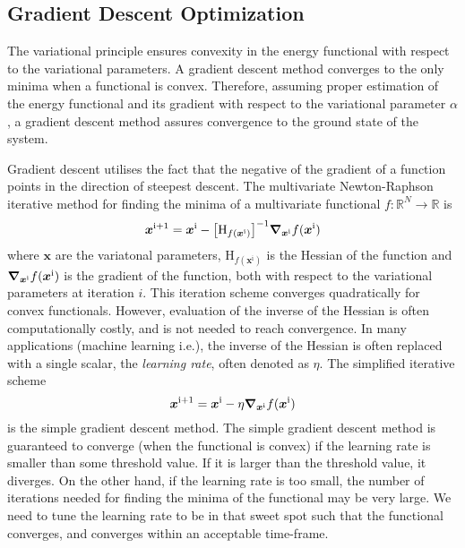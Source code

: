\subsection{Gradient Descent Optimization}\label{sec:gradient_descent}

The variational principle ensures convexity in the energy functional with respect to the variational parameters. A gradient descent method converges to the only minima when a functional is convex. Therefore, assuming proper estimation of the energy functional and its gradient with respect to the variational parameter $\alpha$, a gradient descent method assures convergence to the ground state of the system. 


Gradient descent utilises the fact that the negative of the gradient of a function points in the direction of steepest descent. The multivariate Newton-Raphson iterative method for finding the minima of a multivariate functional $f:\mathbb{R}^N\to\mathbb{R}$ is   
\begin{equation}
    \bm{x}^{\mathrm{i}+1} = \bm{x}^{\mathrm{i}} - \qty[\mathrm{H}_{f(\bm{x}^{\mathrm{i}})}]^{-1}\grad_{\bm{x}^{\mathrm{i}}} f(\bm{x}^{\mathrm{i}})
\end{equation}
where $\bm{x}$ are the variatonal parameters, $\mathrm{H}_{f(\bm{x}^{\mathrm{i}})}$ is the Hessian of the function and $\grad_{\bm{x}^{\mathrm{i}}}f(\bm{x}^{\mathrm{i}})$ is the gradient of the function, both with respect to the variational parameters at iteration $i$. This iteration scheme converges quadratically for convex functionals. However, evaluation of the inverse of the Hessian is often computationally costly, and is not needed to reach convergence. In many applications (machine learning i.e.), the inverse of the Hessian is often replaced with a single scalar, the \textit{learning rate}, often denoted as $\eta$. The simplified iterative scheme 
\begin{equation}
    \bm{x}^{\mathrm{i}+1} = \bm{x}^{\mathrm{i}} - \eta\grad_{\bm{x}^{\mathrm{i}}} f(\bm{x}^{\mathrm{i}})
\end{equation}
is the simple gradient descent method. The simple gradient descent method is guaranteed to converge (when the functional is convex) if the learning rate is smaller than some threshold value. If it is larger than the threshold value, it diverges. On the other hand, if the learning rate is too small, the number of iterations needed for finding the minima of the functional may be very large. We need to tune the learning rate to be in that sweet spot such that the functional converges, and converges within an acceptable time-frame.

